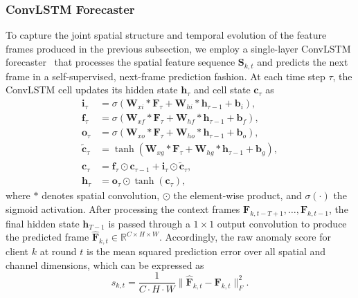 \documentclass[journal]{IEEEtran}
\begin{document}
\subsubsection{ConvLSTM Forecaster}
To capture the joint spatial structure and temporal evolution of the feature frames produced in the previous subsection, we employ a single-layer ConvLSTM forecaster~\cite{shi2015convolutional} that processes the spatial feature sequence $\mathbf{S}_{k,t}$ and predicts the next frame in a self-supervised, next-frame prediction fashion. At each time step $\tau$, the ConvLSTM cell updates its hidden state $\mathbf{h}_\tau$ and cell state $\mathbf{c}_\tau$ as
\begin{align}
\mathbf{i}_\tau &= \sigma(\mathbf{W}_{xi} * \mathbf{F}_\tau + \mathbf{W}_{hi} * \mathbf{h}_{\tau-1} + \mathbf{b}_i), \label{eq:lstm_i}\\
\mathbf{f}_\tau &= \sigma(\mathbf{W}_{xf} * \mathbf{F}_\tau + \mathbf{W}_{hf} * \mathbf{h}_{\tau-1} + \mathbf{b}_f), \label{eq:lstm_f}\\
\mathbf{o}_\tau &= \sigma(\mathbf{W}_{xo} * \mathbf{F}_\tau + \mathbf{W}_{ho} * \mathbf{h}_{\tau-1} + \mathbf{b}_o), \label{eq:lstm_o}\\
\tilde{\mathbf{c}}_\tau &= \tanh(\mathbf{W}_{xg} * \mathbf{F}_\tau + \mathbf{W}_{hg} * \mathbf{h}_{\tau-1} + \mathbf{b}_g), \label{eq:lstm_g}\\
\mathbf{c}_\tau &= \mathbf{f}_\tau \odot \mathbf{c}_{\tau-1} + \mathbf{i}_\tau \odot \tilde{\mathbf{c}}_\tau, \label{eq:lstm_c}\\
\mathbf{h}_\tau &= \mathbf{o}_\tau \odot \tanh(\mathbf{c}_\tau), \label{eq:lstm_h}
\end{align}
where $*$ denotes spatial convolution, $\odot$ the element-wise product, and $\sigma(\cdot)$ the sigmoid activation. After processing the context frames $\mathbf{F}_{k,t-T+1}, \ldots, \mathbf{F}_{k,t-1}$, the final hidden state $\mathbf{h}_{T-1}$ is passed through a $1 \times 1$ output convolution to produce the predicted frame $\hat{\mathbf{F}}_{k,t} \in \mathbb{R}^{C \times H \times W}$. Accordingly, the raw anomaly score for client $k$ at round $t$ is the mean squared prediction error over all spatial and channel dimensions, which can be expressed as
\begin{equation}
s_{k,t} = \frac{1}{C \cdot H \cdot W} \|\hat{\mathbf{F}}_{k,t} - \mathbf{F}_{k,t}\|_F^2.
\label{eq:anomaly_score}
\end{equation}
\end{document}
